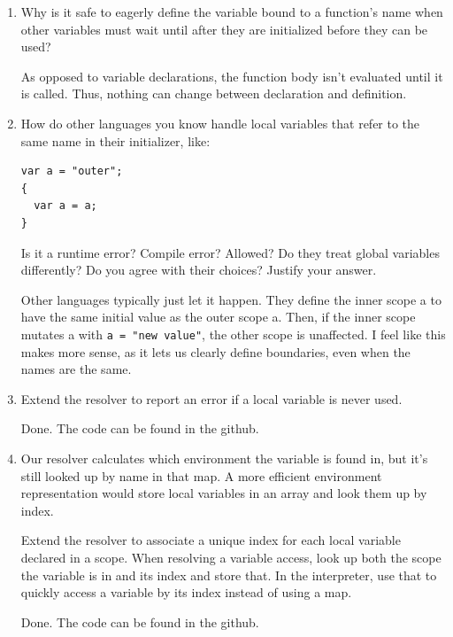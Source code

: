 \documentclass{article}
\begin{document}
\begin{enumerate}
    \item {
        Why is it safe to eagerly define the variable bound to a function’s name when other variables must wait until after they are initialized before they can be used?

        As opposed to variable declarations, the function body isn't evaluated
        until it is called. Thus, nothing can change between declaration and 
        definition.
    }

    \item {
        How do other languages you know handle local variables that refer to the same name in their initializer, like:

        \begin{verbatim}
var a = "outer";
{
  var a = a;
}
        \end{verbatim}
Is it a runtime error? Compile error? Allowed? Do they treat global variables differently? Do you agree with their choices? Justify your answer.

        Other languages typically just let it happen. They define the inner scope 
        a to have the same initial value as the outer scope a. Then, if the inner 
        scope mutates a with \verb|a = "new value"|, the other scope is unaffected.
        I feel like this makes more sense, as it lets us clearly define boundaries,
        even when the names are the same.
    }

    \item {
        Extend the resolver to report an error if a local variable is never used.

        Done. The code can be found in the github.
    }

    \item {
        Our resolver calculates which environment the variable is found in, but it’s still looked up by name in that map. A more efficient environment representation would store local variables in an array and look them up by index.

Extend the resolver to associate a unique index for each local variable declared in a scope. When resolving a variable access, look up both the scope the variable is in and its index and store that. In the interpreter, use that to quickly access a variable by its index instead of using a map.

        Done. The code can be found in the github.
    }
\end{enumerate}
\end{document}
